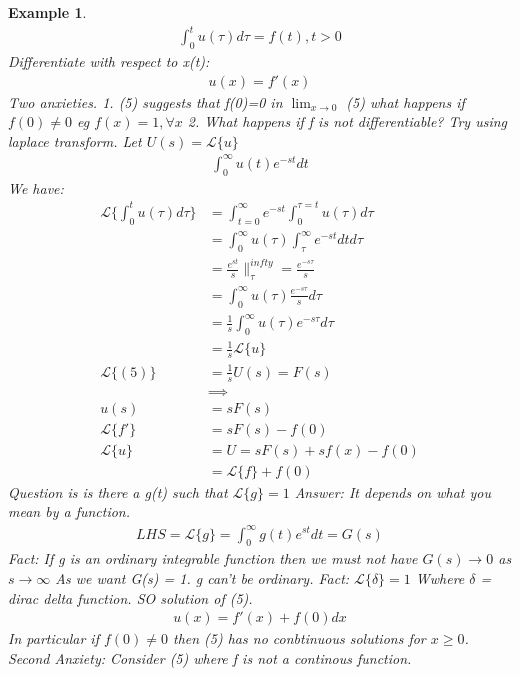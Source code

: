 \documentclass[10pt, oneside]{article}
\newtheorem{example}{Example}
\begin{document}
\begin{example}
    \begin{align}
        \int_{0}^{t} u (\tau) d\tau = f(t), t > 0
    \end{align}
    Differentiate with respect to x(t):
    \begin{align*}
        u(x) = f'(x)
    \end{align*}
    Two anxieties.
    1. (5) suggests that f(0)=0 in $\lim_{x\to 0}$ (5)  what happens if $f(0) \neq 0$ eg $f(x) = 1, \forall x$
    2. What happens if f is not differentiable? Try using laplace transform. Let $U(s) = \mathscr{L}\{u\}$
    \begin{align*}
        \int_{0}^{\infty} u(t) e^{-st} dt 
    \end{align*}
    We have:
    \begin{align*}
        \mathscr{L}\{\int_{0}^{t} u(\tau) d\tau \} &= \int_{t=0}^{\infty} e^{-st}\int_{0}^{\tau = t} u(\tau) d\tau \\
        &= \int_{0}^{\infty}u(\tau) \int_{\tau}^{\infty} e^{-st} dt d\tau\\
        &= \frac{e^{st}}{s}\|_{\tau}^{infty} = \frac{e^{-s\tau}}{s} \\
        &= \int_{0}^{\infty} u(\tau) \frac{e^{-s\tau}}{s} d\tau\\
        &= \frac{1}{s} \int_{0}^{\infty} u(\tau) e^{-s\tau}d\tau\\
        &= \frac{1}{s} \mathscr{L}\{u\}\\
        \mathscr{L} \{ (5) \} &=\frac{1}{s} U(s) = F(s)\\
        & \implies \\
        u(s) & = sF(s)\\
        \mathscr{L} \{ f'\} & = sF(s) -f(0)\\
        \mathscr{L} \{ u \} & = U = sF(s) +sf(x)- f(0)\\
        &= \mathscr{L} \{f\} + f(0) 
    \end{align*}
    Question is is there a g(t) such that $\mathscr{L} \{ g \} =1$ Answer: It depends on what you mean by a function. 
    \begin{align*}
        LHS = \mathscr{L} \{g\} = \int_{0}^{\infty} g(t) e^{st} dt = G(s)
    \end{align*}
    Fact: If g is an ordinary integrable function then we must not have $G(s) \to 0$ as $s \to \infty$ As we want G(s) = 1. g can't be ordinary. Fact: $\mathscr{L} \{\delta\}=1$ Wwhere $\delta$ = dirac delta function. SO solution of (5).
    \begin{align*}
        u(x) =f'(x) + f(0)dx
    \end{align*} 
    In particular if $f(0) \neq 0$ then (5) has no conbtinuous solutions for $x \geq 0$.
    Second Anxiety: Consider (5) where f is not a continous function. 
\end{example}
\end{document}
